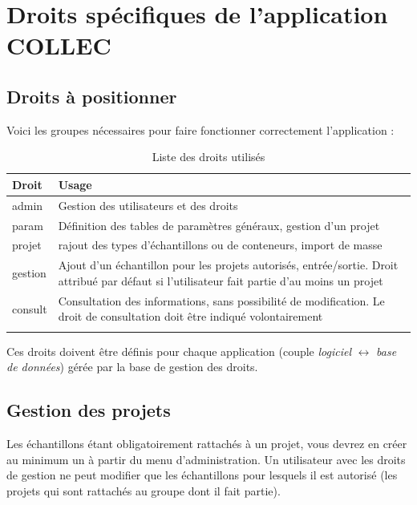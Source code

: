 \section{Droits spécifiques de l'application COLLEC}

\subsection{Droits à positionner}
Voici les groupes nécessaires pour faire fonctionner correctement l'application :

\begin{longtable}{|p{5cm}|p{10cm}|}
\hline
\textbf{Droit} & \textbf{Usage} \\
\hline
\endhead
admin &	Gestion des utilisateurs et des droits\\
\hline
param &	Définition des tables de paramètres généraux, gestion d'un projet\\
\hline
projet &	rajout des types d'échantillons ou de conteneurs, import de masse \\
\hline
gestion &	Ajout d'un échantillon pour les projets autorisés, entrée/sortie. Droit attribué par défaut si l'utilisateur fait partie d'au moins un projet \\
\hline
consult	& Consultation des informations, sans possibilité de modification. Le droit de consultation doit être indiqué volontairement\\
\hline
\caption{Liste des droits utilisés}
\end{longtable}

Ces droits doivent être définis pour chaque application (couple \textit{logiciel} $\leftrightarrow$ \textit{base de données}) gérée par la base de gestion des droits.

\subsection{Gestion des projets}

Les échantillons étant obligatoirement rattachés à un projet, vous devrez en créer au minimum un à partir du menu d'administration. Un utilisateur avec les droits de gestion ne peut modifier que les échantillons pour lesquels il est autorisé (les projets qui sont rattachés au groupe dont il fait partie).

